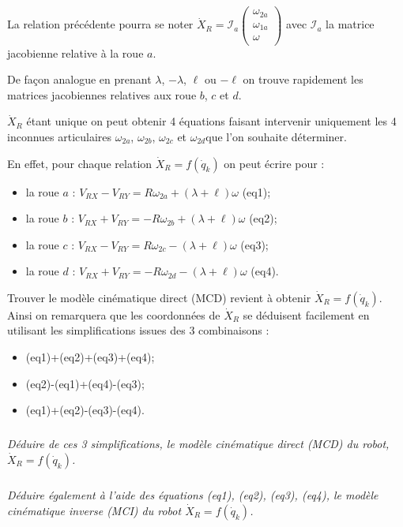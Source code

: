 \begin{multicols}{2}
La relation précédente pourra se noter $\dot{X}_R = \mathcal{I}_a \begin{pmatrix}
\omega_{2a} \\ \omega_{1a}\\ \omega_{}\end{pmatrix}$ avec $\mathcal{I}_a$ la matrice jacobienne relative à la roue $a$.

De façon analogue en prenant $\lambda$, $-\lambda$, $\ell$ ou $-\ell$ on trouve rapidement les matrices jacobiennes relatives aux roue $b$, $c$ et $d$.

$\dot{X}_R$ étant unique on peut obtenir 4 équations faisant intervenir uniquement les 4 inconnues articulaires $\omega_{2a}$, $\omega_{2b}$, $\omega_{2c}$ et $\omega_{2d}$que l'on souhaite déterminer.

En effet, pour chaque relation $\dot{X}_R = f\left(\dot{q}_k \right)$ on peut écrire pour :
\begin{itemize}
\item la roue $a$ : $V_{RX}-V_{RY}=R\omega_{2a}+\left(\lambda+\ell\right)\omega$ (eq1);
\item la roue $b$ : $V_{RX}+V_{RY}=-R\omega_{2b}+\left(\lambda+\ell\right)\omega$ (eq2);
\item la roue $c$ : $V_{RX}-V_{RY}=R\omega_{2c}-\left(\lambda+\ell\right)\omega$ (eq3);
\item la roue $d$ : $V_{RX}+V_{RY}=-R\omega_{2d}-\left(\lambda+\ell\right)\omega$ (eq4).
\end{itemize}

Trouver le modèle cinématique direct (MCD) revient à obtenir $\dot{X}_R = f\left(\dot{q}_k \right)$. Ainsi on remarquera que les coordonnées de $\dot{X}_R$ se déduisent facilement en utilisant les simplifications issues des 3 combinaisons :
\begin{itemize}
 \item (eq1)+(eq2)+(eq3)+(eq4);
 \item (eq2)-(eq1)+(eq4)-(eq3);
 \item (eq1)+(eq2)-(eq3)-(eq4).
\end{itemize}



\subparagraph{}
\textit{Déduire de ces 3 simplifications, le modèle cinématique direct (MCD) du robot, $\dot{X}_R = f\left(\dot{q}_k \right)$.}
\ifprof%
\begin{corrige}
\end{corrige}\else\fi

\subparagraph{}
\textit{Déduire également à l'aide des équations (eq1), (eq2), (eq3), (eq4), le modèle cinématique inverse (MCI) du robot 
$\dot{X}_R = f\left(\dot{q}_k \right)$.}
\ifprof%
\begin{corrige}
\end{corrige}\else\fi





\end{multicols}
